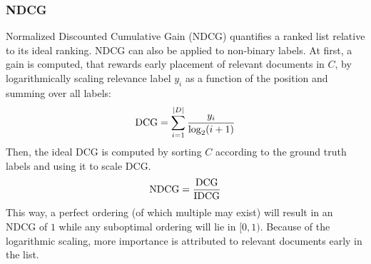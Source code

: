 \subsubsection{NDCG}
Normalized Discounted Cumulative Gain (NDCG) quantifies a ranked list relative to its ideal ranking. NDCG can also be applied to non-binary labels. At first, a gain is computed, that rewards early placement of relevant documents in $C$, by logarithmically scaling relevance label $y_i$ as a function of the position and summing over all labels:
\begin{equation}
    \text{DCG} = \sum_{i=1}^{|D|} \frac{y_i}{\log_2(i+1)}
\end{equation}
Then, the ideal DCG is computed by sorting $C$ according to the ground truth labels and using it to scale DCG.
\begin{equation}
    \text{NDCG} = \frac{\text{DCG}}{\text{IDCG}}
\end{equation}
This way, a perfect ordering (of which multiple may exist) will result in an NDCG of $1$ while any suboptimal ordering will lie in $[0, 1)$. Because of the logarithmic scaling, more importance is attributed to relevant documents early in the list.

